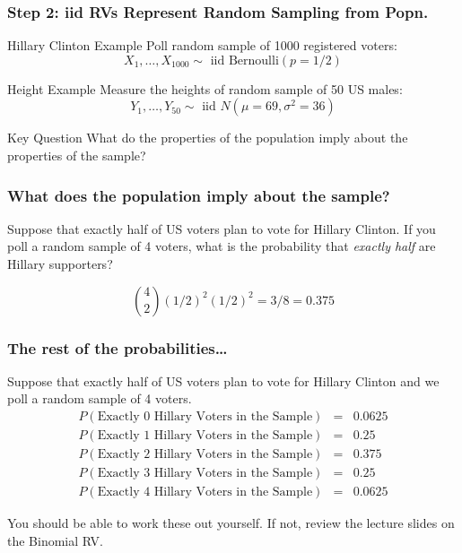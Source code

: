 \documentclass{beamer}
\begin{document}
\begin{frame}
  \frametitle{Step 2: iid RVs Represent Random Sampling from Popn.}
  \begin{block}{Hillary Clinton Example}
   Poll random sample of 1000 registered voters:
   $$X_1, \hdots, X_{1000} \sim \mbox{ iid Bernoulli}(p = 1/2)$$
  \end{block}
  \begin{block}{Height Example}
   Measure the heights of random sample of 50 US males:
   $$Y_1, \hdots, Y_{50}  \sim \mbox{ iid } N(\mu = 69, \sigma^2 = 36)$$
  \end{block}

  \begin{block}{Key Question}
   What do the properties of the population imply about the properties of the sample? 
  \end{block}
\end{frame}
\begin{frame}
  \frametitle{What does the population imply about the sample? }
Suppose that exactly half of US voters plan to vote for Hillary Clinton. 
If you poll a random sample of 4 voters, what is the probability that \emph{exactly half} are Hillary supporters? 

\pause

\alert{$${4 \choose 2} \left( 1/2 \right)^2 \left( 1/2 \right)^2 = 3/8 = 0.375$$}
\end{frame}
\begin{frame}
  \frametitle{The rest of the probabilities\dots}
  Suppose that exactly half of US voters plan to vote for Hillary Clinton and we poll a random sample of 4 voters.
  \begin{eqnarray*}
    P\left( \mbox{Exactly 0 Hillary Voters in the Sample} \right) &=& 0.0625\\
    P\left( \mbox{Exactly 1 Hillary Voters in the Sample} \right) &=& 0.25\\
    P\left( \mbox{Exactly 2 Hillary Voters in the Sample} \right) &=& 0.375\\
    P\left( \mbox{Exactly 3 Hillary Voters in the Sample} \right) &=& 0.25\\
    P\left( \mbox{Exactly 4 Hillary Voters in the Sample} \right) &=& 0.0625 
  \end{eqnarray*}

  \vspace{1em}
  \alert{You should be able to work these out yourself. If not, review the lecture slides on the Binomial RV.}
\end{frame}
\end{document}
